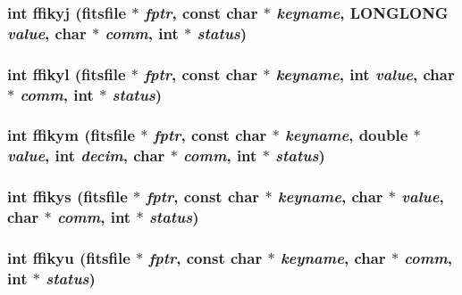 \subsubsection{\setlength{\rightskip}{0pt plus 5cm}int ffikyj (\bf{fitsfile} $\ast$ {\em fptr}, const char $\ast$ {\em keyname}, \bf{LONGLONG} {\em value}, char $\ast$ {\em comm}, int $\ast$ {\em status})}\label{fitsio_8h_13613553fb1fc6a12fd7cd38c8d434bb}


\subsubsection{\setlength{\rightskip}{0pt plus 5cm}int ffikyl (\bf{fitsfile} $\ast$ {\em fptr}, const char $\ast$ {\em keyname}, int {\em value}, char $\ast$ {\em comm}, int $\ast$ {\em status})}\label{fitsio_8h_a4ca40c0298931f7db20e3bc061dad32}


\subsubsection{\setlength{\rightskip}{0pt plus 5cm}int ffikym (\bf{fitsfile} $\ast$ {\em fptr}, const char $\ast$ {\em keyname}, double $\ast$ {\em value}, int {\em decim}, char $\ast$ {\em comm}, int $\ast$ {\em status})}\label{fitsio_8h_304bdae48864568598985614f7d2fdac}


\subsubsection{\setlength{\rightskip}{0pt plus 5cm}int ffikys (\bf{fitsfile} $\ast$ {\em fptr}, const char $\ast$ {\em keyname}, char $\ast$ {\em value}, char $\ast$ {\em comm}, int $\ast$ {\em status})}\label{fitsio_8h_05970f0b7eb3d0035419ea3aaddb3517}


\subsubsection{\setlength{\rightskip}{0pt plus 5cm}int ffikyu (\bf{fitsfile} $\ast$ {\em fptr}, const char $\ast$ {\em keyname}, char $\ast$ {\em comm}, int $\ast$ {\em status})}\label{fitsio_8h_ac2fa658a69fab1f16bd0b0b5d492bd3}


